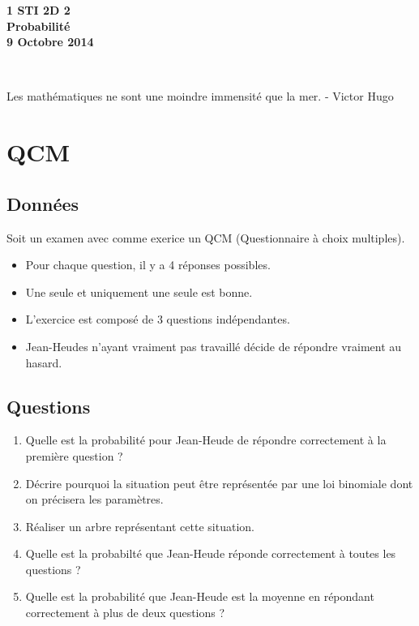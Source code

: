 \documentclass[11pt]{article}
\begin{document}

\begin{minipage}[t]{\textwidth}
  \raggedright
      {\bfseries 1 STI 2D 2}\\[.35ex]
      \vspace*{-1cm}
      \raggedleft
          {\bfseries Probabilité}\\[.35ex]
          {\bfseries 9 Octobre 2014}\\[.35ex]
\end{minipage}\\[1em]

\begin{center}
  \textsf{Les mathématiques ne sont une moindre immensité que la mer. - Victor Hugo}
\end{center}



\setlength{\columnseprule}{1pt}

\section*{QCM}
\subsection*{Données}

Soit un examen avec comme exerice un QCM (Questionnaire à choix multiples).
\begin{itemize}
\item Pour chaque question, il y a 4 réponses possibles. 
\item Une seule et uniquement une seule est bonne. 
\item L'exercice est composé de 3 questions indépendantes.
\item Jean-Heudes n'ayant vraiment pas travaillé décide de répondre vraiment au hasard.
\end{itemize}

\subsection*{Questions}
\begin{enumerate}
\item Quelle est la probabilité pour Jean-Heude de répondre correctement à la première question ?
\item Décrire pourquoi la situation peut être représentée par une loi binomiale dont on précisera les paramètres.
\item Réaliser un arbre représentant cette situation.
\item Quelle est la probabilté que Jean-Heude réponde correctement à toutes les questions ?
\item Quelle est la probabilité que Jean-Heude est la moyenne en répondant correctement à plus de deux questions ?
\end{enumerate}
\end{document}
